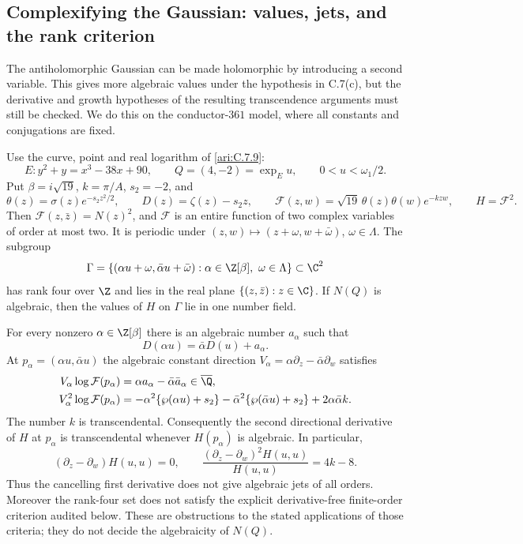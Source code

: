 \subsection{Complexifying the Gaussian: values, jets, and the rank criterion}

The antiholomorphic Gaussian can be made holomorphic by introducing a
second variable. This gives more algebraic values under the hypothesis
in C.7(c), but the derivative and growth hypotheses of the resulting
transcendence arguments must still be checked. We do this on the
conductor-$361$ model, where all constants and conjugations are fixed.

\begin{proposition}\label{ari:C.7.11}
Use the curve, point and real logarithm of \ref{ari:C.7.9}:
\[
 E:y^2+y=x^3-38x+90,\qquad Q=(4,-2)=\exp_Eu,
 \qquad 0<u<\omega_1/2.
\]
Put $\beta=i\sqrt{19}$, $k=\pi/A$, $s_2=-2$, and
\[
 \theta(z)=\sigma(z)e^{-s_2z^2/2},\qquad
 D(z)=\zeta(z)-s_2z,\qquad
 \mathcal F(z,w)=\sqrt{19}\,\theta(z)\theta(w)e^{-kzw},
 \qquad H=\mathcal F^2.
\]
Then $\mathcal F(z,\bar z)=N(z)^2$, and $\mathcal F$ is an
entire function of two complex variables of order at most two.
It is periodic under $(z,w)\mapsto(z+\omega,w+\bar\omega)$,
$\omega\in\Lambda$. The subgroup
\[
 \Gamma=\{(\alpha u+\omega,\bar\alpha u+\bar\omega):
                   \alpha\in\Z[\beta],\ \omega\in\Lambda\}
 \subset\C^2
\]
has rank four over $\Z$ and lies in the real plane
$\{(z,\bar z):z\in\C\}$. If $N(Q)$ is algebraic, then the
values of $H$ on $\Gamma$ lie in one number field.

For every nonzero $\alpha\in\Z[\beta]$ there is an algebraic
number $a_\alpha$ such that
\[
 D(\alpha u)=\bar\alpha D(u)+a_\alpha.
\]
At $p_\alpha=(\alpha u,\bar\alpha u)$ the algebraic constant
direction $V_\alpha=\alpha\partial_z-\bar\alpha\partial_w$
satisfies
\begin{align*}
 V_\alpha\log\mathcal F(p_\alpha)
    &=\alpha a_\alpha-\bar\alpha\bar a_\alpha
                         \in\overline{\Q},\\
 V_\alpha^2\log\mathcal F(p_\alpha)
    &=-\alpha^2\{\wp(\alpha u)+s_2\}
      -\bar\alpha^2\{\wp(\bar\alpha u)+s_2\}
      +2\alpha\bar\alpha k.
\end{align*}
The number $k$ is transcendental. Consequently the second
directional derivative of $H$ at $p_\alpha$ is transcendental
whenever $H(p_\alpha)$ is algebraic. In particular,
\[
 (\partial_z-\partial_w)H(u,u)=0,\qquad
 \frac{(\partial_z-\partial_w)^2H(u,u)}{H(u,u)}=4k-8.
\]
Thus the cancelling first derivative does not give algebraic jets
of all orders. Moreover the rank-four set does not satisfy the
explicit derivative-free finite-order criterion audited below.
These are obstructions to the stated applications of those
criteria; they do not decide the algebraicity of $N(Q)$.
\end{proposition}



